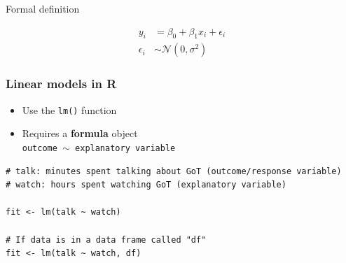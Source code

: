 \documentclass[pdf,handout]{beamer}
\begin{document}
\begin{frame}{Formal definition}

$$
\begin{aligned}
y_i & = \beta_0 + \beta_1x_i + \epsilon_i \\
\epsilon_i & \sim \mathcal{N}(0, \sigma^2)
\end{aligned}
$$

\vfill


\vfill


\end{frame}

\begin{frame}[fragile]
\frametitle{Linear models in R}

\begin{itemize}\addtolength{\itemsep}{0.5\baselineskip}
    \item Use the \texttt{lm()} function
    \item Requires a \textbf{formula} object\\ \texttt{outcome $\sim$ explanatory variable}
\end{itemize}

\vfill

\begin{lstlisting}[style=R]
# talk: minutes spent talking about GoT (outcome/response variable)
# watch: hours spent watching GoT (explanatory variable) 

fit <- lm(talk ~ watch)

# If data is in a data frame called "df"
fit <- lm(talk ~ watch, df) 
\end{lstlisting}

\end{frame}
\end{document}
